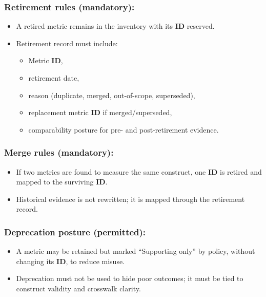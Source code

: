 \documentclass[10pt]{article}
\begin{document}
\subsubsection*{Retirement rules (mandatory):}

\begin{itemize}
\item A retired metric remains in the inventory with its \textbf{ID} reserved.
\item Retirement record must include:
  \begin{itemize}
  \item Metric \textbf{ID},
  \item retirement date,
  \item reason (duplicate, merged, out-of-scope, superseded),
  \item replacement metric \textbf{ID} if merged/superseded,
  \item comparability posture for pre- and post-retirement evidence.
  \end{itemize}
\end{itemize}

\subsubsection*{Merge rules (mandatory):}

\begin{itemize}
\item If two metrics are found to measure the same construct, one \textbf{ID} is retired and mapped to the surviving \textbf{ID}.
\item Historical evidence is not rewritten; it is mapped through the retirement record.
\end{itemize}

\subsubsection*{Deprecation posture (permitted):}

\begin{itemize}
\item A metric may be retained but marked “Supporting only” by policy, without changing its \textbf{ID}, to reduce misuse.
\item Deprecation must not be used to hide poor outcomes; it must be tied to construct validity and crosswalk clarity.
\end{itemize}
\end{document}
